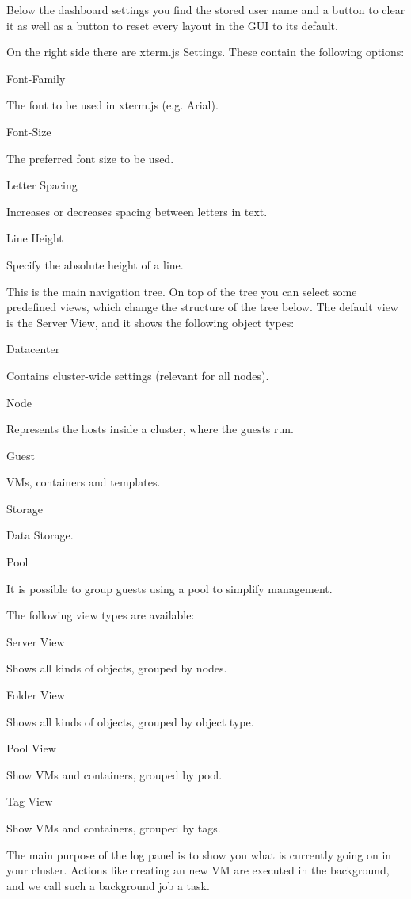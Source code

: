 Below the dashboard settings you find the stored user name and a button to clear it as well as a button to reset every layout in the GUI to its default.

On the right side there are xterm.js Settings. These contain the following options:

Font-Family

The font to be used in xterm.js (e.g. Arial).

Font-Size

The preferred font size to be used.

Letter Spacing

Increases or decreases spacing between letters in text.

Line Height

Specify the absolute height of a line.

This is the main navigation tree. On top of the tree you can select some predefined views, which change the structure of the tree below. The default view is the Server View, and it shows the following object types:

Datacenter

Contains cluster-wide settings (relevant for all nodes).

Node

Represents the hosts inside a cluster, where the guests run.

Guest

VMs, containers and templates.

Storage

Data Storage.

Pool

It is possible to group guests using a pool to simplify management.

The following view types are available:

Server View

Shows all kinds of objects, grouped by nodes.

Folder View

Shows all kinds of objects, grouped by object type.

Pool View

Show VMs and containers, grouped by pool.

Tag View

Show VMs and containers, grouped by tags.

The main purpose of the log panel is to show you what is currently going on in your cluster. Actions like creating an new VM are executed in the background, and we call such a background job a task.

